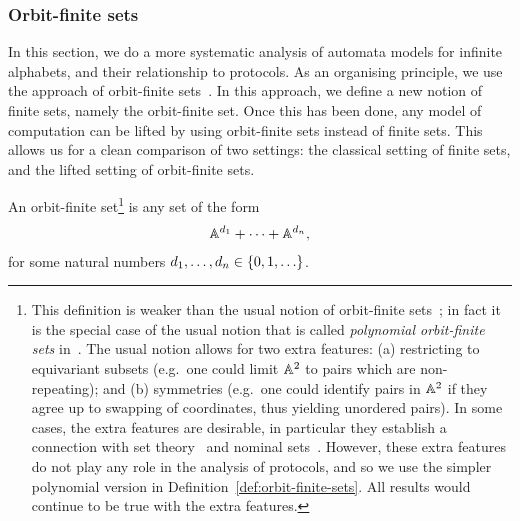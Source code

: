\subsubsection{Orbit-finite sets}
\label{sec:orbit-finite-sets}
In this section, we do a more systematic analysis of automata models for infinite alphabets, and their relationship to protocols. As an organising principle,  we use  the approach of orbit-finite sets~\cite{bojanczykOrbitFiniteSetsTheir2017}. In this approach, we define a new notion of finite sets, namely the orbit-finite set. Once this has been done, any model of computation can be lifted by using orbit-finite sets instead of finite sets. This allows us for a clean comparison of two settings: the classical setting of finite sets, and the lifted setting of orbit-finite sets. 

\begin{definition} \label{def:orbit-finite-sets}
    An orbit-finite set\footnote{
This definition is weaker than the usual notion of orbit-finite sets~\cite[Section 5]{bojanczyk_slightly}; in fact it is the special case of the usual notion that is called \emph{polynomial orbit-finite sets} in~\cite[Section 1]{bojanczyk_slightly}.
The usual notion  allows for two extra features: (a) restricting to equivariant subsets (e.g.~one could limit $\mathbb A^2$ to pairs which are non-repeating); and (b)  symmetries (e.g.~one could identify pairs in $\mathbb A^2$ if they agree up to swapping of coordinates, thus yielding unordered pairs). In some cases, the extra features are desirable, in particular they establish a connection with set theory~\cite{blassDedekind2016} and  nominal sets~\cite[Section 5]{PittsAM:nomsns}. However, these extra features  do not play any role in the analysis of protocols, and so we use the  simpler polynomial version in Definition~\ref{def:orbit-finite-sets}. All results would continue to be true with the extra features.
} is any set of the form 
    \begin{align*}
    \mathbb A^{d_1} + \cdots + \mathbb A^{d_n},
    \end{align*}
    for some natural numbers $d_1,\ldots,d_n \in \{0,1,\ldots\}$. 
\end{definition}

